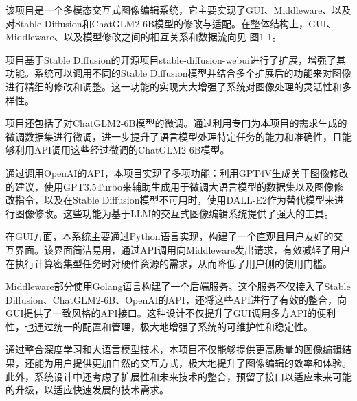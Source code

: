 \documentclass[a4paper,AutoFakeBold,oneside,12pt]{book}
\begin{document}




该项目是一个多模态交互式图像编辑系统，它主要实现了GUI、Middleware、以及对Stable Diffusion和ChatGLM2-6B模型的修改与适配。在整体结构上，GUI、Middleware、以及模型修改之间的相互关系和数据流向见 图1-1。

项目基于Stable Diffusion的开源项目stable-diffusion-webui进行了扩展，增强了其功能。系统可以调用不同的Stable Diffusion模型并结合多个扩展后的功能来对图像进行精细的修改和调整。这一功能的实现大大增强了系统对图像处理的灵活性和多样性。

项目还包括了对ChatGLM2-6B模型的微调。通过利用专门为本项目的需求生成的微调数据集进行微调，进一步提升了语言模型处理特定任务的能力和准确性，且能够利用API调用这些经过微调的ChatGLM2-6B模型。

通过调用OpenAI的API，本项目实现了多项功能：利用GPT4V生成关于图像修改的建议，使用GPT3.5Turbo来辅助生成用于微调大语言模型的数据集以及图像修改指令，以及在Stable Diffusion模型不可用时，使用DALL-E2作为替代模型来进行图像修改。这些功能为基于LLM的交互式图像编辑系统提供了强大的工具。

在GUI方面，本系统主要通过Python语言实现，构建了一个直观且用户友好的交互界面。该界面简洁易用，通过API调用向Middleware发出请求，有效减轻了用户在执行计算密集型任务时对硬件资源的需求，从而降低了用户侧的使用门槛。

Middleware部分使用Golang语言构建了一个后端服务。这个服务不仅接入了Stable Diffusion、ChatGLM2-6B、OpenAI的API，还将这些API进行了有效的整合，向GUI提供了一致风格的API接口。这种设计不仅提升了GUI调用多方API的便利性，也通过统一的配置和管理，极大地增强了系统的可维护性和稳定性。

通过整合深度学习和大语言模型技术，本项目不仅能够提供更高质量的图像编辑结果，还能为用户提供更加自然的交互方式，极大地提升了图像编辑的效率和体验。此外，系统设计中还考虑了扩展性和未来技术的整合，预留了接口以适应未来可能的升级，以适应快速发展的技术需求。
\end{document}
